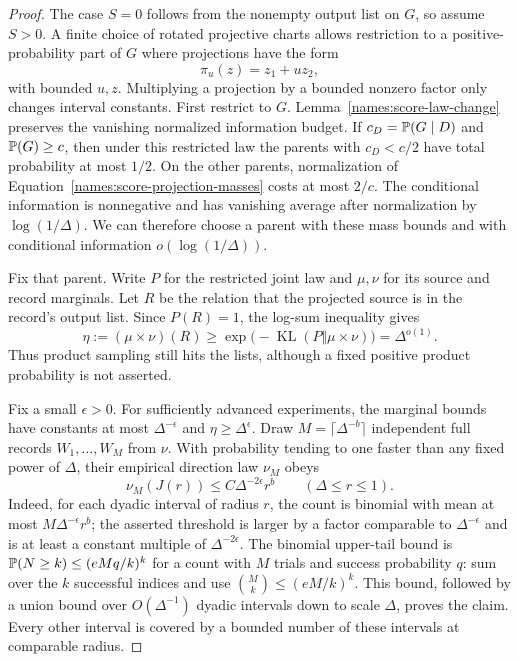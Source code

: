 \begin{proof}
The case $S=0$ follows from the nonempty output list on $G$, so assume
$S>0$.  A finite choice of rotated projective charts allows restriction
to a positive-probability part of $G$ where projections have the form
\[
 \pi_u(z)=z_1+uz_2,
\]
with bounded $u,z$.  Multiplying a projection by a bounded nonzero
factor only changes interval constants.  First restrict to $G$.
Lemma~\ref{names:score-law-change} preserves the vanishing normalized
information budget.  If $c_D=\mathbb P(G\mid D)$ and $\mathbb P(G)\ge c$,
then under this restricted law the parents with $c_D<c/2$ have total
probability at most $1/2$.  On the other parents, normalization of
Equation~\eqref{names:score-projection-masses} costs at most $2/c$.
The conditional information is nonnegative and has vanishing average
after normalization by $\log(1/\Delta)$.  We can therefore choose a
parent with these mass bounds and with conditional information
$o(\log(1/\Delta))$.

Fix that parent.  Write $P$ for the restricted joint law and
$\mu,\nu$ for its source and record marginals.  Let $R$ be the relation
that the projected source is in the record's output list.  Since
$P(R)=1$, the log-sum inequality gives
\[
 \eta:=(\mu\times\nu)(R)
   \ge\exp\bigl(-\operatorname{KL}(P\Vert\mu\times\nu)\bigr)
   =\Delta^{o(1)}.
\]
Thus product sampling still hits the lists, although a fixed positive
product probability is not asserted.

Fix a small $\epsilon>0$.  For sufficiently advanced experiments,
the marginal bounds have constants at most $\Delta^{-\epsilon}$ and
$\eta\ge\Delta^\epsilon$.  Draw
$M=\lceil\Delta^{-b}\rceil$ independent full records
$W_1,\ldots,W_M$ from $\nu$.  With probability tending to one faster
than any fixed power of $\Delta$, their empirical direction law
$\nu_M$ obeys
\begin{equation}
 \nu_M(J(r))\le C\Delta^{-2\epsilon}r^b
 \qquad(\Delta\le r\le1).
 \label{names:score-empirical-directions}
\end{equation}
Indeed, for each dyadic interval of radius $r$, the count is binomial
with mean at most $M\Delta^{-\epsilon}r^b$; the asserted threshold is
larger by a factor comparable to $\Delta^{-\epsilon}$ and is at least
a constant multiple of $\Delta^{-2\epsilon}$.  The binomial upper-tail
bound is $\mathbb P(N\ge k)\le(eMq/k)^k$ for a count with $M$ trials and
success probability $q$: sum over the $k$ successful indices and use
$\binom{M}{k}\le(eM/k)^k$.  This bound, followed by a union bound over
$O(\Delta^{-1})$ dyadic intervals down to scale $\Delta$, proves the
claim.  Every other interval is
covered by a bounded number of these intervals at comparable radius.


\end{proof}

